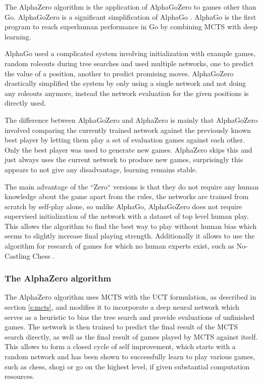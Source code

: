 \documentclass[12pt,onecolumn,oneside,titlepage]{article}
\begin{document}
The AlphaZero algorithm \cite{silver2018general} is the application of AlphaGoZero \cite{silver2017mastering} to games other than Go. AlphaGoZero is a significant simplification of AlphaGo \cite{silver2016mastering}.
AlphaGo  is the first program to reach superhuman performance in Go by combining MCTS with deep learning.

AlphaGo used a complicated system involving initialization with example games, random roleouts during tree searches and used multiple networks, one to predict the value of a position, another to predict promising moves.
AlphaGoZero drastically simplified the system by only using a single network and not doing any roleouts anymore, instead the network evaluation for the given positions is directly used.

The difference between AlphaGoZero and AlphaZero is mainly that AlphaGoZero involved comparing the currently trained network against the previously known best player by letting them play a set of evaluation games against each other.
Only the best player was used to generate new games. AlphaZero skips this and just always uses the current network to produce new games, surprisingly this appears to not give any disadvantage, learning remains stable.

The main advantage of the ``Zero`` versions is that they do not require any human knowledge about the game apart from the rules, the networks are trained from scratch by self-play alone, so unlike AlphaGo, AlphaGoZero does not require supervised initialization 
of the network with a dataset of top level human play. This allows the algorithm to find the best way to play without human bias which seems to slightly increase final playing strength.
Additionally it allows to use the algorithm for research of games for which no human experts exist, such as No-Castling Chess \cite{NoCastleChess}.

\subsubsection{The AlphaZero algorithm}
\label{s:azalgo}

The AlphaZero algorithm \cite{silver2018general} uses MCTS with the UCT formulation, as described in section \ref{s:mcts}, and modifies it to incorporate a deep neural network which serves as a heuristic to bias the tree search and provide evaluations of unfinished games.
The network is then trained to predict the final result of the MCTS search directly, as well as the final result of games played by MCTS against itself.
This allows to form a closed cycle of self improvement, which starts with a random network and has been shown to successfully learn to play various games, such as chess, shogi or go on the highest level, if given substantial computation resources.
\end{document}
